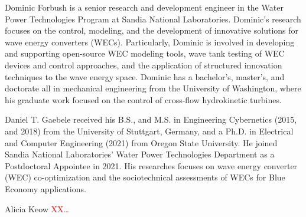 \documentclass[lettersize,journal]{IEEEtran}
\newcommand{\rc}[1]{\textcolor{red}{#1}}
\begin{document}
\begin{IEEEbiography}{Dominic Forbush}
is a senior research and development engineer in the Water Power Technologies Program at Sandia National Laboratories. Dominic’s research focuses on the control, modeling, and the development of innovative solutions for wave energy converters (WECs). Particularly, Dominic is involved in developing and supporting open-source WEC modeling tools, wave tank testing of WEC devices and control approaches, and the application of structured innovation techniques to the wave energy space. Dominic has a bachelor’s, master's, and doctorate all in mechanical engineering from the University of Washington, where his graduate work focused on the control of cross-flow hydrokinetic turbines.
\end{IEEEbiography}

\begin{IEEEbiography}{Daniel T. Gaebele}
received his B.S., and M.S. in Engineering Cybernetics (2015, and 2018) from the University of Stuttgart, Germany, and a Ph.D. in Electrical and Computer Engineering (2021) from Oregon State University. He joined Sandia National Laboratories’ Water Power Technologies Department as a Postdoctoral Appointee in 2021. His researches focuses on wave energy converter (WEC) co-optimization and the sociotechnical assessments of WECs for Blue Economy applications.
\end{IEEEbiography}

\begin{IEEEbiography}{Alicia Keow}
\rc{XX\dots{}}
\end{IEEEbiography}
\end{document}
